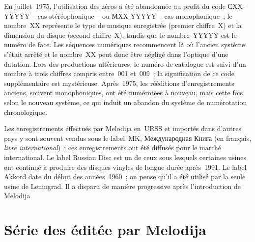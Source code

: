 En juillet~1975, l'utilisation des zéros a été abandonnée au profit du code
\foreignlanguage{russian}{С}XX{-}YYYYY -- cas stéréophonique -- ou
\foreignlanguage{russian}{М}XX{-}YYYYY -- cas monophonique~; le nombre~XX
représente le type de musique enregistrée (premier chiffre~X) et la
dimension du disque (second chiffre~X), tandis que le nombre~YYYYY est le
numéro de face.
Les séquences numériques recommencent là où l'ancien système s'était arrêté
et le nombre~XX peut donc être négligé dans l'optique d'une datation.
Lors des productions ultérieures, le numéro de catalogue est suivi d'un
nombre à trois chiffres compris entre~001 et~009~; la signification de ce
code supplémentaire est mystérieuse.
Après~1975, les rééditions d'enregistrements anciens, souvent monophoniques,
ont été numérotées à nouveau, mais cette fois selon le nouveau système, ce
qui induit un abandon du système de numérotation chronologique.

Les enregistrements effectués par Melodija en~URSS et importés dans d'autres
pays y sont souvent vendus sous le label~MK, \cad \foreignlanguage{russian}
{Международная Книга} (en français, \emph{livre international})~; ces
enregistrements ont été diffusés pour le marché international.
Le label Russian Disc est un de ceux sous lesquels certaines usines ont
continué à produire des disques vinyles de longue durée après~1991.
Le label Akkord date du début des années~1960~; on pense qu'il a été utilisé
par la seule usine de Leningrad.
Il a disparu de manière progressive après l'introduction de Melodija.

\section{Série des  éditée par Melodija}


